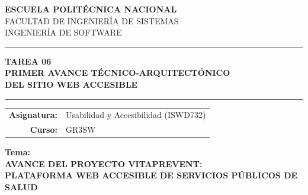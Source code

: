 \documentclass[12pt, a4paper]{article}
\begin{document}

\begin{titlepage}
\centering
\vspace*{0.5cm}


\vspace{0.5cm}
{\LARGE\bfseries\color{navydeep} ESCUELA POLITÉCNICA NACIONAL}\\[4pt]
{\large\color{navydeep} FACULTAD DE INGENIERÍA DE SISTEMAS}\\[2pt]
{\large\color{navydeep} INGENIERÍA DE SOFTWARE}

\vspace{1.2cm}
{\color{royalblue}\rule{0.85\linewidth}{1.5pt}}

\vspace{0.6cm}
{\large\bfseries\color{navydeep} TAREA 06}\\[6pt]
{\Large\bfseries\color{navydeep}
  PRIMER AVANCE TÉCNICO-ARQUITECTÓNICO\\
  DEL SITIO WEB ACCESIBLE}

\vspace{0.8cm}
{\color{royalblue}\rule{0.85\linewidth}{0.8pt}}

\vspace{0.8cm}
\begin{tabular}{@{}rl@{}}
  \textbf{\color{navydeep}Asignatura:} & Usabilidad y Accesibilidad (ISWD732) \\[4pt]
  \textbf{\color{navydeep}Curso:}      & GR3SW \\[8pt]
\end{tabular}

\vspace{0.5cm}
\begin{center}
{\normalsize\bfseries\color{navydeep} Tema:}\\[4pt]
{\large\bfseries\color{royalblue}
  AVANCE DEL PROYECTO VITAPREVENT:\\
  PLATAFORMA WEB ACCESIBLE DE SERVICIOS PÚBLICOS DE SALUD}
\end{center}


\end{titlepage}
\end{document}
